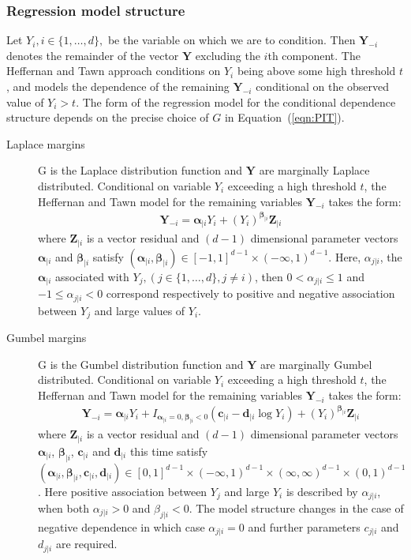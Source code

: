 \documentclass[10pt]{article}\usepackage[]{graphicx}\usepackage[]{color}
\def\bY{\boldsymbol Y}
\def\bZ{\boldsymbol Z}
\def\bc{\boldsymbol c}
\def\bd{\boldsymbol d}
\def\balpha{\boldsymbol \alpha}
\def\bbeta{\boldsymbol \beta}
\begin{document}
\subsubsection{Regression model structure}
%
Let $Y_i, i \in \{1,\ldots,d\},$ be the variable on which we are to condition.  Then $\bY_{-i}$ denotes the remainder of the vector $\bY$ excluding the $i$th component. The Heffernan and Tawn approach conditions on $Y_i$ being above some high threshold $t$, and models the dependence of the remaining $\bY_{-i}$ conditional on the observed value of $Y_i>t$.  The form of the regression model for the conditional dependence structure depends on the precise choice of $G$ in Equation~(\ref{eqn:PIT}).
\begin{description}
\item[Laplace margins] G is the Laplace distribution function and $\bY$ are marginally Laplace distributed.  Conditional on variable $Y_i$ exceeding a high threshold $t$, the Heffernan and Tawn model for the remaining variables $\bY_{-i}$ takes the form:
\begin{eqnarray}\label{eqn:HTlaplace}
\bY_{-i} = \balpha_{|i} Y_i + (Y_i)^{\bbeta_{|i}}\bZ_{|i}
\end{eqnarray}
where $\bZ_{|i}$ is a vector residual and $(d-1)$ dimensional parameter vectors $\balpha_{|i}$ and $\bbeta_{|i}$ satisfy $(\balpha_{|i},\bbeta_{|i}) \in [-1, 1]^{d-1}\times(-\infty, 1)^{d-1}$. Here, $\alpha_{j|i}$, the $\balpha_{|i}$ associated with $Y_j, (j\in \{1,\ldots,d\}, j\neq i)$, then $0 < \alpha_{j|i}\leq 1$ and
$-1 \leq \alpha_{j|i} < 0$ correspond respectively to positive and negative association between $Y_j$ and large values of $Y_i$.
\item[Gumbel margins] G is the Gumbel distribution function and $\bY$ are marginally Gumbel distributed.  Conditional on variable $Y_i$ exceeding a high threshold $t$, the Heffernan and Tawn model for the remaining variables $\bY_{-i}$ takes the form:
\begin{eqnarray}\label{eqn:HTgumbel}
\bY_{-i} = \balpha_{|i} Y_i + I_{\balpha_{|i}=0,\bbeta_{|i}<0}(\bc_{|i}
                                                                        - \bd_{|i} \log Y_i)+ (Y_i)^{\bbeta_{|i}}\bZ_{|i}
\end{eqnarray}
where $\bZ_{|i}$ is a vector residual and $(d-1)$ dimensional parameter vectors $\balpha_{|i}$, $\bbeta_{|i}$, $\bc_{|i}$ and $\bd_{|i}$ this time satisfy $(\balpha_{|i},\bbeta_{|i}, \bc_{|i}, \bd_{|i}) \in [0, 1]^{d-1}\times(-\infty, 1)^{d-1} \times (\infty,\infty)^{d-1}\times(0,1)^{d-1}$.  Here positive association between $Y_j$ and large $Y_i$ is described by $\alpha_{j|i}$, when both $\alpha_{j|i}>0$ and $\beta_{j|i}<0$.  The  model structure changes in the case of negative dependence in which case $\alpha_{j|i}=0$ and further parameters $c_{j|i}$ and $d_{j|i}$ are required.
\end{description}
\end{document}
